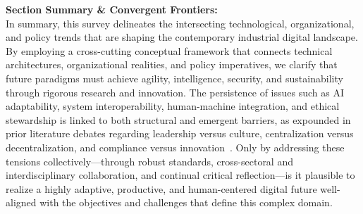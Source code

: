 \documentclass[sigconf]{acmart}
\begin{document}
\vspace{1ex}
\textbf{Section Summary \& Convergent Frontiers:}\\
In summary, this survey delineates the intersecting technological, organizational, and policy trends that are shaping the contemporary industrial digital landscape. By employing a cross-cutting conceptual framework that connects technical architectures, organizational realities, and policy imperatives, we clarify that future paradigms must achieve agility, intelligence, security, and sustainability through rigorous research and innovation. The persistence of issues such as AI adaptability, system interoperability, human-machine integration, and ethical stewardship is linked to both structural and emergent barriers, as expounded in prior literature debates regarding leadership versus culture, centralization versus decentralization, and compliance versus innovation~\cite{ref13}\cite{ref35}\cite{ref41}\cite{ref93}. Only by addressing these tensions collectively---through robust standards, cross-sectoral and interdisciplinary collaboration, and continual critical reflection---is it plausible to realize a highly adaptive, productive, and human-centered digital future well-aligned with the objectives and challenges that define this complex domain.



\end{document}
